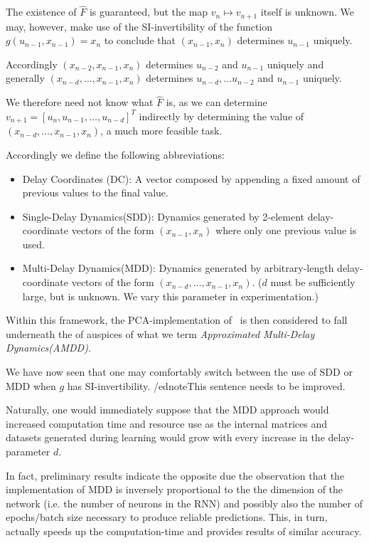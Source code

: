\documentclass[a4paper,12pt,twoside]{report}
\begin{document}
The existence of $\widehat{F}$ is guaranteed, but the map $v_{n}\mapsto{v_{n+1}}$ itself is unknown.
We may, however, make use of the SI-invertibility of the function $g(u_{n-1}, x_{n-1})=x_n$ to conclude that
$(x_{n-1}, x_{n})$ determines $u_{n-1}$ uniquely. 

Accordingly $(x_{n-2}, x_{n-1}, x_{n})$ determines $u_{n-2}$ and $u_{n-1}$ uniquely and generally $(x_{n-d}, \ldots , x_{n-1}, x_{n})$ determines $u_{n-d}, \ldots u_{n-2}$ and $u_{n-1}$ uniquely.

We therefore need not know what $\widehat{F}$ is, as we can determine $v_{n+1}={[u_n, u_{n-1}, \ldots, u_{n-d}]}^T$ indirectly by determining the value of $(x_{n-d}, \ldots , x_{n-1}, x_{n})$, a much more feasible task.

Accordingly we define the following abbreviations:
\begin{itemize}
  \item Delay Coordinates (DC): A vector composed by appending a fixed amount of previous values to the final value.
  \item Single-Delay Dynamics(SDD): Dynamics generated by 2-element delay-coordinate vectors of the form $(x_{n-1}, x_n)$ where only one previous value is used.
  \item Multi-Delay Dynamics(MDD): Dynamics generated by arbitrary-length delay-coordinate vectors of the form $(x_{n-d}, \ldots , x_{n-1}, x_{n})$. ($d$ must be sufficiently large, but is unknown. We vary this parameter in experimentation.)
\end{itemize}

Within this framework, the PCA-implementation of~\cite{manjunath2021universal} is then considered to fall underneath the of auspices of what we term \emph{Approximated Multi-Delay Dynamics(AMDD)}.

We have now seen that one may comfortably switch between the use of SDD or MDD when $g$ has SI-invertibility. /ednote{This sentence needs to be improved.}

Naturally, one would immediately suppose that the MDD approach would increased computation time and resource use as the internal matrices and datasets generated during learning would grow with every increase in the delay-parameter $d$. 

In fact, preliminary results indicate the opposite due the observation that the implementation of MDD is inversely proportional to the the dimension of the network (i.e. the number of neurons in the RNN) and possibly also the number of epochs/batch size necessary to produce reliable predictions. 
This, in turn, actually speeds up the computation-time and provides results of similar accuracy. 
\end{document}
